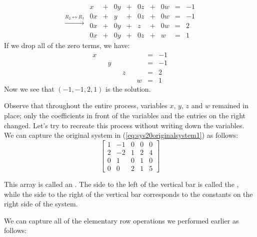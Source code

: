 \documentclass{ximera}
\begin{document}
\begin{exploration}
\begin{equation}\label{eq:sys20rref1}
\begin{array}{c}
\\
\xrightarrow{R_2\leftrightarrow R_3}\\
\\
 \end{array}
\begin{array}{ccccccccc}
      x &+ &0y&+&0z&+&0w&= &-1 \\
   0x& +&y&+&0z&+&0w&=&-1\\
   0x& +&0y&+&z&+&0w&=&2\\
     0x&+&0y&+&0z&+&w&=&1
    \end{array}
    \end{equation}
    If we drop all of the zero terms, we have:
    \begin{equation}\label{eq:sys20rrefnozeros}
    \begin{array}{ccccccccc}
      x & &&&&&&= &-1 \\
   & &y&&&&&=&-1\\
   & &&&z&&&=&2\\
     &&&&&&w&=&1
    \end{array}
    \end{equation}
Now we see that $(-1, -1, 2, 1)$ is the solution.

Observe that throughout the entire process, variables $x$, $y$, $z$ and $w$ remained in place; only the coefficients in front of the variables and the entries on the right changed.  Let's try to recreate this process without writing down the variables.  We can capture the original system in (\ref{eq:sys20originalsystem1}) as follows:
$$\left[\begin{array}{cccc|c}  
 1&-1&0&0&0\\2&-2&1&2&4\\0&1&0&1&0\\0&0&2&1&5
 \end{array}\right]$$
 
 This array is called an .  The side to the left of the vertical bar is called the , while the side to the right of the vertical bar corresponds to the constants on the right side of the system.
 
 We can capture all of the elementary row operations we performed earlier as follows:


\end{exploration}
\end{document}
